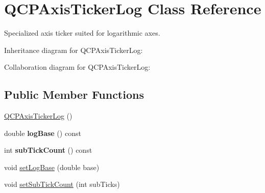 \hypertarget{classQCPAxisTickerLog}{}\section{Q\+C\+P\+Axis\+Ticker\+Log Class Reference}
\label{classQCPAxisTickerLog}


Specialized axis ticker suited for logarithmic axes.  




Inheritance diagram for Q\+C\+P\+Axis\+Ticker\+Log\+:


Collaboration diagram for Q\+C\+P\+Axis\+Ticker\+Log\+:
\subsection*{Public Member Functions}
\begin{DoxyCompactItemize}
\item 
\hyperlink{classQCPAxisTickerLog_af3cb86ea5eef2023c0b96b5260c4cbdf}{Q\+C\+P\+Axis\+Ticker\+Log} ()
\item 
double {\bfseries log\+Base} () const \hypertarget{classQCPAxisTickerLog_abba2a2aead5551b433940fa39a53ca09}{}\label{classQCPAxisTickerLog_abba2a2aead5551b433940fa39a53ca09}

\item 
int {\bfseries sub\+Tick\+Count} () const \hypertarget{classQCPAxisTickerLog_ad7a648bfa6ee3ad33b1c43bd7b84e9ab}{}\label{classQCPAxisTickerLog_ad7a648bfa6ee3ad33b1c43bd7b84e9ab}

\item 
void \hyperlink{classQCPAxisTickerLog_ac6e3b4e03baea3816f898869ab9751ef}{set\+Log\+Base} (double base)
\item 
void \hyperlink{classQCPAxisTickerLog_ad51989c798c0cfd50936d77aac57c56a}{set\+Sub\+Tick\+Count} (int sub\+Ticks)
\end{DoxyCompactItemize}
